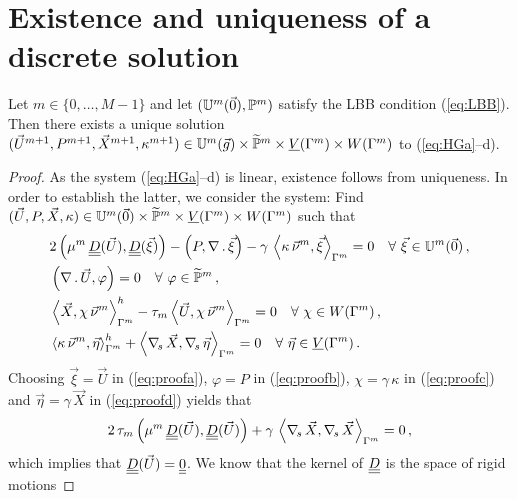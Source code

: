 \section{Existence and uniqueness of a discrete solution}
\label{sec:stokes_existence}
\begin{theorem} \label{thm:ex}
Let $m \in \{0,\ldots,M-1\}$ and let $(\uspacedisc{0}{m},\pspace^m)$ satisfy
the LBB condition (\ref{eq:LBB}). Then there exists a unique solution
$(\vec U^{m+1}, P^{m+1}, \vec X^{m+1}, \kappa^{m+1})
\in \uspacedisc{g}{m}\times \pnormspace^m \times \Vh \times \Wh$ to
(\ref{eq:HGa}--d).
\end{theorem}
\begin{proof}
\sloppy As the system (\ref{eq:HGa}--d) is linear, existence follows from
uniqueness. In order to establish the latter, we consider the system: Find
${(\vec U, P, \vec X, \kappa) \in \uspacedisc{0}{m}\times\pnormspace^m \times
\Vh \times \Wh}$ such that
\begin{subequations}
\begin{align}
& 2\left(\mu^m\,\mat D(\vec U), \mat D(\vec \xi) \right)
- \left(P, \nabla\,.\,\vec \xi\right) - \gamma\,\left\langle \kappa\,\vec\nu^m,
\vec\xi\right\rangle_{\Gamma^m} = 0 \quad \forall\ \vec\xi \in
\uspacedisc{0}{m} \,,
\label{eq:proofa}\\
& \left(\nabla\,.\,\vec U, \varphi\right)  = 0 \quad
\forall\ \varphi \in \pnormspace^m\,, \label{eq:proofb} \\
& \left\langle \vec X, \chi\,\vec\nu^m \right\rangle_{\Gamma^m}^h -
\tau_m \left\langle \vec U, \chi\,\vec\nu^m \right\rangle_{\Gamma^m} = 0
\quad\forall\ \chi \in \Wh\,,\label{eq:proofc} \\
& \left\langle \kappa\,\vec\nu^m, \vec\eta \right\rangle_{\Gamma^m}^h
+ \left\langle \nabs\,\vec X, \nabs\,\vec \eta \right\rangle_{\Gamma^m}
= 0  \quad\forall\ \vec\eta \in \Vh\,. \label{eq:proofd}
\end{align}
\end{subequations}
Choosing $\vec\xi=\vec U$ in (\ref{eq:proofa}), $\varphi =  P$ in
(\ref{eq:proofb}), $\chi = \gamma\,\kappa$ in (\ref{eq:proofc}) and
$\vec\eta=\gamma\,\vec X$ in (\ref{eq:proofd}) yields that
\begin{equation}
2\,\tau_m\left(\mu^m\,\mat D(\vec U), \mat D(\vec U) \right)
+ \gamma\,\left\langle \nabs\,\vec X, \nabs\,\vec X \right\rangle_{\Gamma^m}
=0\,, \label{eq:proof2}
\end{equation}
which implies that $\mat D(\vec U) = \mat 0$. We know that the kernel of
$\mat D$ is the space of rigid motions

\end{proof}
